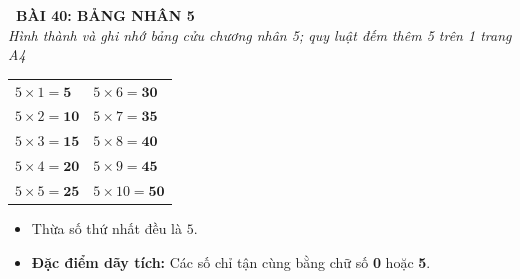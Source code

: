 \documentclass[11pt,a4paper]{article}
\begin{document}
\begin{tcolorbox}[
  enhanced,
  colback=violet!8!white,
  colframe=violet!70!black,
  arc=3mm, boxrule=1.2pt,
  left=3mm, right=3mm, top=2mm, bottom=2mm,
  halign=center
]
  {\LARGE\bfseries\color{violet!90!black}\faBookmark\ BÀI 40: BẢNG NHÂN 5}\\[1mm]
  {\itshape\footnotesize\color{black!75} Hình thành và ghi nhớ bảng cửu chương nhân 5; quy luật đếm thêm 5 trên 1 trang A4}
\end{tcolorbox}

\vspace{-2mm}

\noindent
\begin{minipage}[t]{0.49\textwidth}\vspace{0pt}
\begin{tcolorbox}[
  enhanced,
  colback=violet!4!white,
  colframe=violet!75!black,
  arc=2mm, boxrule=0.8pt,
  left=2mm, right=2mm, top=1.8mm, bottom=1.8mm,
  title={\footnotesize\bfseries\color{white}\faKey\ 1. Bảng nhân 5 chuẩn mực}
]
{\footnotesize
\begin{tabular}{l@{\quad}l}
  $5 \times 1 = \mathbf{5}$ & $5 \times 6 = \mathbf{30}$ \\
  $5 \times 2 = \mathbf{10}$ & $5 \times 7 = \mathbf{35}$ \\
  $5 \times 3 = \mathbf{15}$ & $5 \times 8 = \mathbf{40}$ \\
  $5 \times 4 = \mathbf{20}$ & $5 \times 9 = \mathbf{45}$ \\
  $5 \times 5 = \mathbf{25}$ & $5 \times 10 = \mathbf{50}$
\end{tabular}
\vspace{1mm}
\begin{itemize}\setlength{\itemsep}{0.5pt}\setlength{\leftskip}{-2.5mm}
  \item Thừa số thứ nhất đều là $5$.
  \item \textbf{Đặc điểm dãy tích:} Các số chỉ tận cùng bằng chữ số \textbf{0} hoặc \textbf{5}.
\end{itemize}
}
\end{tcolorbox}
\end{minipage}
\hfill
\end{document}
